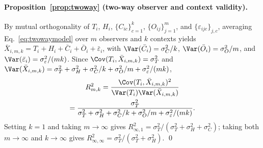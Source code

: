 \paragraph{Proposition~\ref{prop:twoway} (two-way observer and context validity).}
By mutual orthogonality of $T_i$, $H_i$, $\{C_{ic}\}_{c=1}^k$, $\{O_{ij}\}_{j=1}^m$, and $\{\varepsilon_{ijc}\}_{j,c}$,
averaging Eq.~\eqref{eq:twowaymodel} over $m$ observers and $k$ contexts yields
$\bar X_{i,m,k}=T_i+H_i+\bar C_i+\bar O_i+\bar\varepsilon_i$, with $\Var(\bar C_i)=\sigma_C^2/k$,
$\Var(\bar O_i)=\sigma_O^2/m$, and $\Var(\bar\varepsilon_i)=\sigma_\varepsilon^2/(mk)$. Since $\Cov(T_i,\bar X_{i,m,k})=\sigma_T^2$
and $\Var(\bar X_{i,m,k})=\sigma_T^2+\sigma_H^2+\sigma_C^2/k+\sigma_O^2/m+\sigma_\varepsilon^2/(mk)$,
\begin{multline*}
R^2_{m,k}=\frac{\Cov(T_i,\bar X_{i,m,k})^2}{\Var(T_i)\Var(\bar X_{i,m,k})}\\
=\frac{\sigma_T^2}{\sigma_T^2+\sigma_H^2+\sigma_C^2/k+\sigma_O^2/m+\sigma_\varepsilon^2/(mk)}.
\end{multline*}
Setting $k=1$ and taking $m\to\infty$ gives $R^2_{\infty,1}=\sigma_T^2/(\sigma_T^2+\sigma_H^2+\sigma_C^2)$; taking both
$m\to\infty$ and $k\to\infty$ gives $R^2_{\infty,\infty}=\sigma_T^2/(\sigma_T^2+\sigma_H^2)$. \qed
